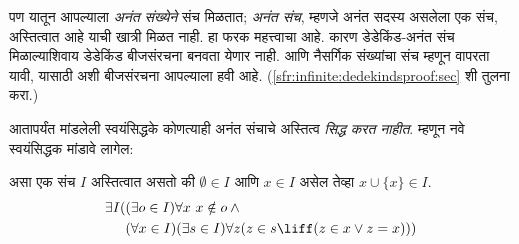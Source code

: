 पण यातून आपल्याला \emph{अनंत संख्येने} संच मिळतात; \emph{अनंत संच}, म्हणजे अनंत सदस्य असलेला एक संच, अस्तित्वात आहे याची खात्री मिळत नाही. हा फरक महत्त्वाचा आहे. कारण डेडेकिंड-अनंत संच मिळाल्याशिवाय डेडेकिंड बीजसंरचना बनवता येणार नाही. आणि नैसर्गिक संख्यांचा संच म्हणून वापरता यावी, यासाठी अशी बीजसंरचना आपल्याला हवी आहे. (\ref{sfr:infinite:dedekindsproof:sec} शी तुलना करा.)

आतापर्यंत मांडलेली स्वयंसिद्धके कोणत्याही अनंत संचाचे अस्तित्व \emph{सिद्ध करत नाहीत}. म्हणून नवे स्वयंसिद्धक मांडावे लागेल:

\begin{axiom}[अनंतता]
असा एक संच $I$ अस्तित्वात असतो की $\emptyset \in I$ आणि $x \in I$ असेल तेव्हा $x \cup \{x\} \in I$.
\begin{align*}
	\exists I( & (\exists o \in I)\forall x\ x \notin o \land {}\\
	& (\forall x \in I)(\exists s \in I)\forall z(z \in s \liff (z \in x \lor z = x)))
\end{align*}
\end{axiom}

